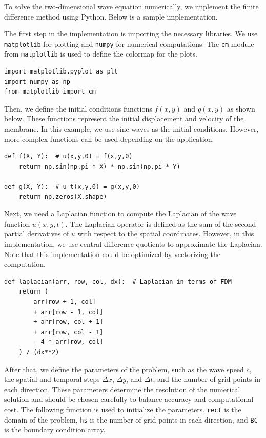 \documentclass{article}
\begin{document}
To solve the two-dimensional wave equation numerically, we implement the finite difference method using Python. Below is a sample implementation.

The first step in the implementation is importing the necessary libraries. We use \texttt{matplotlib} for plotting and \texttt{numpy} for numerical computations. The \texttt{cm} module from \texttt{matplotlib} is used to define the colormap for the plots.

\begin{lstlisting}[style=Python, caption={Libraries}]
import matplotlib.pyplot as plt
import numpy as np
from matplotlib import cm
\end{lstlisting}

Then, we define the initial conditions functions \(f(x, y)\) and \(g(x, y)\) as
shown below. These functions represent the initial displacement and velocity of
the membrane. In this example, we use sine waves as the initial conditions.
However, more complex functions can be used depending on the application.

\begin{lstlisting}[style=Python, caption={Initial Conditions Functions}]
def f(X, Y):  # u(x,y,0) = f(x,y,0)
    return np.sin(np.pi * X) * np.sin(np.pi * Y)

def g(X, Y):  # u_t(x,y,0) = g(x,y,0)
    return np.zeros(X.shape)
\end{lstlisting}

Next, we need a Laplacian function to compute the Laplacian of the wave
function \(u(x, y, t)\). The Laplacian operator is defined as the sum of the
second partial derivatives of \(u\) with respect to the spatial coordinates.
However, in this implementation, we use central difference quotients to
approximate the Laplacian. Note that this implementation could be optimized by
vectorizing the computation.

\begin{lstlisting}[style=Python, caption={Laplacian Function}]
def laplacian(arr, row, col, dx):  # Laplacian in terms of FDM
    return (
        arr[row + 1, col]
        + arr[row - 1, col]
        + arr[row, col + 1]
        + arr[row, col - 1]
        - 4 * arr[row, col]
    ) / (dx**2)
\end{lstlisting}

After that, we define the parameters of the problem, such as the wave speed
\(c\), the spatial and temporal steps \(\Delta x\), \(\Delta y\), and \(\Delta
t\), and the number of grid points in each direction. These parameters
determine the resolution of the numerical solution and should be chosen
carefully to balance accuracy and computational cost. The following function is
used to initialize the parameters. \texttt{rect} is the domain of the problem,
\texttt{hs} is the number of grid points in each direction, and \texttt{BC} is
the boundary condition array.
\end{document}
